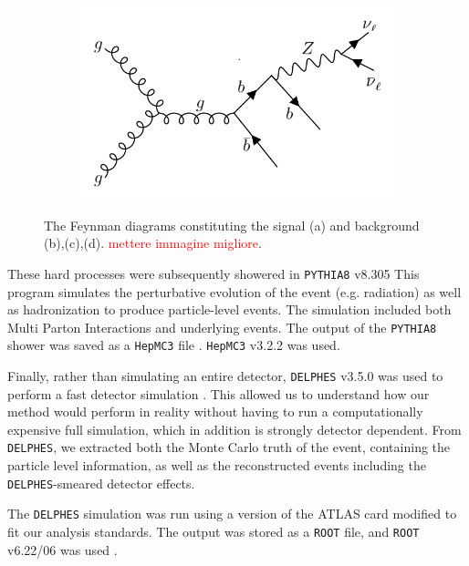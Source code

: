 \documentclass[10pt,a4paper]{book}
\newcommand\todo[1]{\textcolor{red}{#1}}
\def\code#1{\texttt{#1}}
\begin{document}
\begin{figure}
\begin{subfigure}{.5\textwidth}
\caption{}
\end{subfigure}
\begin{subfigure}{.5\textwidth}
\centering
\includegraphics[scale=0.15]{ch4_images/gbb3}
\caption{}
\end{subfigure}
\caption{The Feynman diagrams constituting the signal (a) and background (b),(c),(d). \todo{mettere immagine migliore}.}
\label{zhbb + gbb feynman diagrams}
\end{figure}

These hard processes were subsequently showered in \code{PYTHIA8} v8.305 \cite{Sjostrand:2014zea} This program simulates the perturbative evolution of the event (e.g. radiation) as well as hadronization to produce particle-level events. The simulation included both Multi Parton Interactions and underlying events. The output of the \code{PYTHIA8} shower was saved as a \code{HepMC3} file \cite{BUCKLEY2021107310, Dobbs:2001ck}. \code{HepMC3} v3.2.2 was used.

Finally, rather than simulating an entire detector, \code{DELPHES} v3.5.0 was used to perform a fast detector simulation \cite{Ovyn:2009tx, deFavereau:2013fsa}. This allowed us to understand how our method would perform in reality without having to run a computationally expensive full simulation, which in addition is strongly detector dependent. From \code{DELPHES}, we extracted both the Monte Carlo truth of the event, containing the particle level information, as well as the reconstructed events including the \code{DELPHES}-smeared detector effects. 

The \code{DELPHES} simulation was run using a version of the ATLAS card modified to fit our analysis standards. The output was stored as a \code{ROOT} file, and \code{ROOT} v6.22/06 was used \cite{fons_rademakers_2020_3895852}. 
\end{document}

